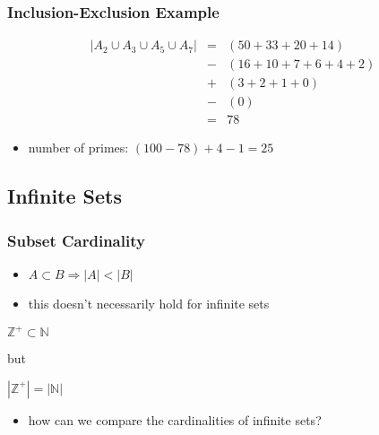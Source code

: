 \documentclass[dvipsnames]{beamer}
\begin{document}
\begin{frame}
  \frametitle{Inclusion-Exclusion Example}

  \begin{example}
    \begin{eqnarray*}
      |A_2 \cup A_3 \cup A_5 \cup A_7| & = & (50 + 33 + 20 +14)\\
                                       & - & (16 + 10 + 7 + 6 + 4 + 2)\\
                                       & + & (3 + 2 + 1 + 0)\\
                                       & - & (0)\\
                                       & = & 78
    \end{eqnarray*}

    \pause
    \begin{itemize}
      \item number of primes: $(100 - 78) + 4 - 1 = 25$
    \end{itemize}
  \end{example}
\end{frame}

\subsection{Infinite Sets}

\begin{frame}
  \frametitle{Subset Cardinality}

  \begin{itemize}
    \item $A \subset B \Rightarrow |A| < |B|$

    \pause
    \item this doesn't necessarily hold for infinite sets
  \end{itemize}

  \begin{example}
$\mathbb{Z}^+ \subset \mathbb{N}$

\smallskip
but

\smallskip
$|\mathbb{Z}^+| = |\mathbb{N}|$
  \end{example}

  \pause
  \begin{itemize}
    \item how can we compare the cardinalities of infinite sets?
  \end{itemize}
\end{frame}
\end{document}

